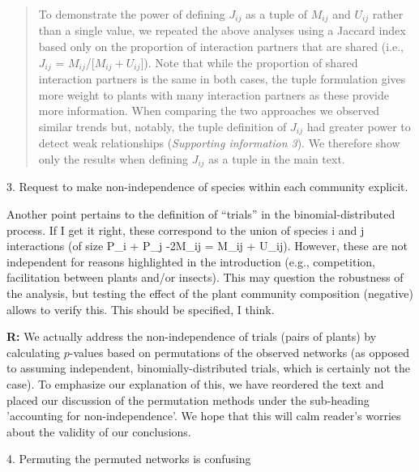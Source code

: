 \documentclass[12pt]{letter}
\newenvironment{refquote}{\bigskip \begin{it}}{\end{it}\smallskip}
\begin{document}
			\begin{quotation}

				To demonstrate the power of defining $J_{ij}$ as a tuple of $M_{ij}$ and $U_{ij}$ rather than a single value, we repeated the above analyses using a Jaccard index based only on the proportion of interaction partners that are shared (i.e., $J_{ij}$ = $M_{ij}$/[$M_{ij}+U_{ij}$]). Note that while the proportion of shared interaction partners is the same in both cases, the tuple formulation gives more weight to plants with many interaction partners as these provide more information. When comparing the two approaches 
				we observed similar trends but, notably, the tuple definition of $J_{ij}$ had greater power to detect weak relationships (\emph{Supporting information 3}). We therefore show only the results when defining $J_{ij}$ as a tuple in the main text.

			\end{quotation}


	3. Request to make non-independence of species within each community explicit. 

		\begin{refquote}
			Another point pertains to the definition of “trials” in the binomial-distributed process. If I get it right, these correspond to the union of species i and j interactions (of size P\_i + P\_j -2M\_ij = M\_ij + U\_ij). However, these are not independent for reasons highlighted in the introduction (e.g., competition, facilitation between plants and/or insects). This may question the robustness of the analysis, but testing the effect of the plant community composition (negative) allows to verify this. This should be specified, I think.
		\end{refquote}


		\textbf{R:} We actually address the non-independence of trials (pairs of plants) by calculating $p$-values based on permutations of the observed networks (as opposed to assuming independent, binomially-distributed trials, which is certainly not the case). To emphasize our explanation of this, we have reordered the text and placed our discussion of the permutation methods under the sub-heading 'accounting for non-independence'. We hope that this will calm reader's worries about the validity of our conclusions.


	4. Permuting the permuted networks is confusing
\end{document}
